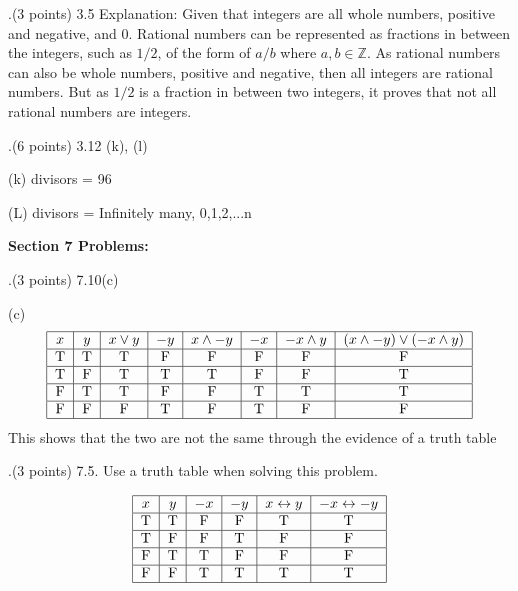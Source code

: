 \documentclass[12pt]{article}
\begin{document}
.(3 points) 3.5
\vspace{.15in}
\newline
Explanation: Given that integers are all whole numbers, positive and negative, and 0. Rational numbers can be represented as fractions in between the integers, such as $1/2$, of the form of $a/b$ where $a,b \in \mathbb{Z}$. As rational numbers can also be whole numbers, positive and negative, then all integers are rational numbers. But as $1/2$ is a fraction in between two integers, it proves that not all rational numbers are integers. 
\vspace{0.25in}

.(6 points) 3.12  (k), (l)
\vspace{.25in}

(k) divisors = 96

(L) divisors = Infinitely many, {0,1,2,...n}

\vspace{.25in}



\noindent \textbf{Section 7 Problems:} 
\vspace{.15in}

.(3 points) 7.10(c)    
\vspace{.15in}

(c) 
\[ %
\begin{tabular}{|c|c|c|c|c|c|c|c|} 
\hline %
$x$ & $y$ & $x\vee y$ & $-y$ & $x\wedge -y$ & $-x$ & $-x\wedge y$ & $(x \wedge -y) \vee (-x \wedge y)$ \\ 
\hline
T&T&T&F&F&F&F&F \\
\hline 
T&F&T&T&T&F&F&T\\
\hline
F&T&T&F&F&T&T&T\\
\hline
F&F&F&T&F&T&F&F \\
\hline
\end{tabular} %
\] %
This shows that the two are not the same through the evidence of a truth table 
\vspace{0.25in}



.(3 points) 7.5.  Use a truth table when solving this problem.      
\vspace{.15in}

\[ %
\begin{tabular}{|c|c|c|c|c|c|} 
\hline %
$x$ & $y$ & $-x$ & $-y$ & $x\leftrightarrow y$ & $-x \leftrightarrow -y$ \\ 
\hline
T&T&F&F&T&T \\
\hline 
T&F&F&T&F&F \\
\hline
F&T&T&F&F&F \\
\hline
F&F&T&T&T&T \\
\hline
\end{tabular} %
\] %
\end{document}
